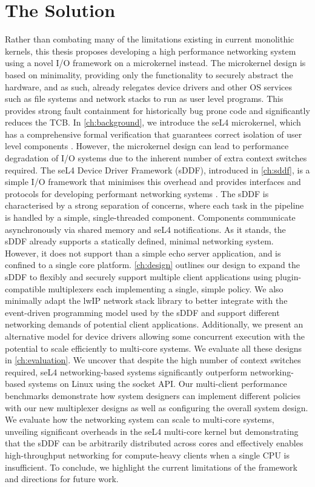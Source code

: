 \section{The Solution}
Rather than combating many of the limitations existing in current monolithic kernels,
this thesis proposes developing a high performance networking system using a novel I/O framework on
a microkernel instead. The microkernel design is based on minimality, providing only the functionality to
securely abstract the hardware, and as such, already relegates device drivers and
other OS services such as file systems and network stacks to run as user level programs. This provides
strong fault containment for historically bug prone code and significantly reduces the TCB.
In \autoref{ch:background}, we introduce the seL4 microkernel, which has a comprehensive formal verification
that guarantees correct isolation of user level components \cite{Klein_AEMSKH_14}.
However, the microkernel design can lead to performance
degradation of I/O systems due to the inherent number of extra context switches required. The seL4 Device Driver
Framework (sDDF), introduced in \autoref{ch:sddf}, is a simple I/O framework that minimises this overhead
and provides interfaces and protocols for developing performant networking systems \cite{Parker_22:sddf}. The sDDF
is characterised by a strong separation of concerns, where each task in the pipeline is handled by a simple, single-threaded
component. Components communicate asynchronously via shared memory and seL4 notifications. As it stands, the sDDF
already supports a statically defined, minimal networking system. However, it does not support than a simple echo 
server application, and is confined to a single core platform. \autoref{ch:design} outlines our design to expand
the sDDF to flexibly and securely support multiple client applications using plugin-compatible
multiplexers each implementing a single, simple policy. We also minimally adapt the lwIP \cite{Dunkels_01} network
stack library to better integrate with the event-driven programming model used by the sDDF and support 
different networking demands of potential client applications. Additionally, we present an alternative model for
device drivers allowing some concurrent execution with the potential to scale efficiently to multi-core systems.
We evaluate all these designs in \autoref{ch:evaluation}. We uncover that despite the high number of context switches
required, seL4 networking-based systems significantly outperform networking-based systems on Linux using the socket API.
Our multi-client performance benchmarks demonstrate how system designers can implement different policies with our
new multiplexer designs as well as configuring the overall system design. We evaluate how the networking system can
scale to multi-core systems, unveiling significant overheads in the seL4 multi-core kernel but demonstrating that
the sDDF can be arbitrarily distributed across cores and effectively enables high-throughput networking for
compute-heavy clients when a single CPU is insufficient. To conclude, we highlight
the current limitations of the framework and directions for future work. 

